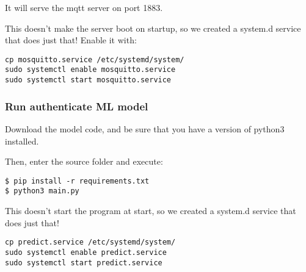 It will serve the mqtt server on port 1883.


This doesn't make the server boot on startup, so we created a system.d service that does just that! Enable it with:
\begin{verbatim}
cp mosquitto.service /etc/systemd/system/ 
sudo systemctl enable mosquitto.service
sudo systemctl start mosquitto.service
\end{verbatim}

\subsubsection{Run authenticate ML model}\label{run-ia}
Download the model code, and be sure that you have a version of python3 installed.

Then, enter the source folder and execute:
\begin{verbatim}
$ pip install -r requirements.txt
$ python3 main.py
\end{verbatim}

This doesn't start the program at start, so we created a system.d service that does just that!
\begin{verbatim}
cp predict.service /etc/systemd/system/ 
sudo systemctl enable predict.service
sudo systemctl start predict.service
\end{verbatim}
